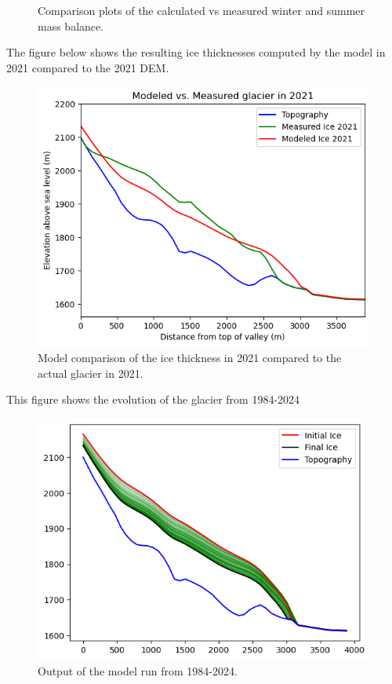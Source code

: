 \documentclass{article}
\begin{document}
\begin{figure}[h]
\begin{subfigure}[b]{0.49\textwidth}
        \label{fig:summer_mb_compare}
    \end{subfigure}
    \caption{Comparison plots of the calculated vs measured winter and summer mass balance.}
    \label{fig:mb_comparison}
\end{figure}
\FloatBarrier

The figure below shows the resulting ice thicknesses computed by the model in 2021 compared to the 2021 DEM.
\begin{figure}[h!]
    \centering
    \includegraphics[width=\textwidth]{Plots/2021_glacier_comparison.png}
    \caption{Model comparison of the ice thickness in 2021 compared to the actual glacier in 2021.}
    \label{fig:2021_glacier_comparison}
\end{figure}
\FloatBarrier

This figure shows the evolution of the glacier from 1984-2024
\begin{figure}[h!]
    \centering
    \includegraphics[width=\textwidth]{Plots/model_run_1984_2024.png}
    \caption{Output of the model run from 1984-2024.}
    \label{fig:model_run_1984_2024}
\end{figure}
\FloatBarrier
\end{document}
